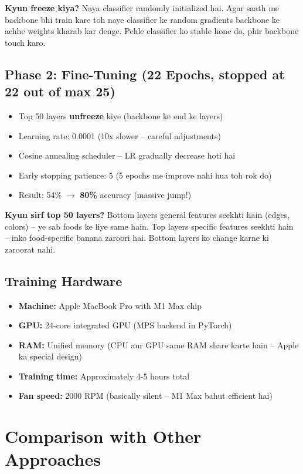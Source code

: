 \documentclass[11pt,a4paper]{article}
\begin{document}
\textbf{Kyun freeze kiya?} Naya classifier randomly initialized hai. Agar saath me backbone bhi train kare toh naye classifier ke random gradients backbone ke achhe weights kharab kar denge. Pehle classifier ko stable hone do, phir backbone touch karo.

\subsection{Phase 2: Fine-Tuning (22 Epochs, stopped at 22 out of max 25)}
\begin{itemize}[leftmargin=1.2cm]
\item Top 50 layers \textbf{unfreeze} kiye (backbone ke end ke layers)
\item Learning rate: 0.0001 (10x slower -- careful adjustments)
\item Cosine annealing scheduler -- LR gradually decrease hoti hai
\item Early stopping patience: 5 (5 epochs me improve nahi hua toh rok do)
\item Result: 54\% $\rightarrow$ \textbf{80\%} accuracy (massive jump!)
\end{itemize}

\textbf{Kyun sirf top 50 layers?} Bottom layers general features seekhti hain (edges, colors) -- ye sab foods ke liye same hain. Top layers specific features seekhti hain -- inko food-specific banana zaroori hai. Bottom layers ko change karne ki zaroorat nahi.

\subsection{Training Hardware}
\begin{itemize}[leftmargin=1.2cm]
\item \textbf{Machine:} Apple MacBook Pro with M1 Max chip
\item \textbf{GPU:} 24-core integrated GPU (MPS backend in PyTorch)
\item \textbf{RAM:} Unified memory (CPU aur GPU same RAM share karte hain -- Apple ka special design)
\item \textbf{Training time:} Approximately 4-5 hours total
\item \textbf{Fan speed:} 2000 RPM (basically silent -- M1 Max bahut efficient hai)
\end{itemize}

\section{Comparison with Other Approaches}
\end{document}
